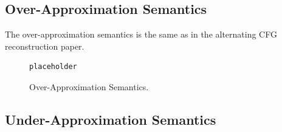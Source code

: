 \documentclass{kththesis}
\begin{document}
\subsection{Over-Approximation Semantics}

The over-approximation semantics is the same as in the alternating CFG reconstruction paper.

\begin{figure}[h]
    \centering
\begin{lstlisting}
placeholder
\end{lstlisting}
\caption[Over-Approximation Semantics.]{Over-Approximation Semantics.}
    \label{fig:overApproximationSemantics}
\end{figure}

\subsection{Under-Approximation Semantics}
\end{document}
